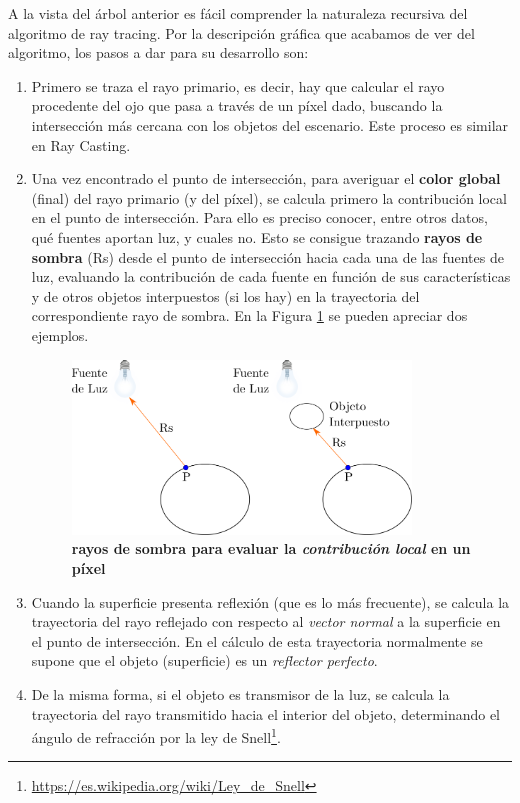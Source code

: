 A la vista del árbol anterior es fácil comprender la naturaleza recursiva del algoritmo de ray tracing. Por la descripción gráfica que acabamos de ver del algoritmo, los pasos a dar para su desarrollo son:
\begin{enumerate}
    \item Primero se traza el rayo primario, es decir, hay que calcular el rayo procedente del ojo que pasa a través de un píxel dado, buscando la intersección más cercana con los objetos del escenario. Este proceso es similar en Ray Casting.
\item Una vez encontrado el punto de intersección, para averiguar el \textbf{color global} (final) del rayo primario (y del píxel), se calcula primero la contribución local en el punto de intersección. Para ello es preciso conocer, entre otros datos, qué fuentes aportan luz, y cuales no. Esto se consigue trazando \textbf{rayos de sombra} (Rs) desde el punto de intersección hacia cada una de las fuentes de luz, evaluando la contribución de cada fuente en función de sus características y de otros objetos interpuestos (si los hay) en la trayectoria del correspondiente rayo de sombra. En la Figura \ref{fig:grafica12a} se pueden apreciar dos ejemplos.
\begin{figure}[h]
    \includegraphics[width=9cm]{Img/CPD/grafica12a.png}
    \centering
    \caption{\textbf{\footnotesize{  rayos de sombra para evaluar la \textit{contribución local} en un píxel   }}}
    \label{fig:grafica12a}
\end{figure}
\item Cuando la superficie presenta reflexión (que es lo más frecuente), se calcula la trayectoria del rayo reflejado con respecto al \textit{vector normal} a la superficie en el punto de intersección. En el cálculo de esta trayectoria normalmente se supone que el objeto (superficie) es un \textit{reflector perfecto}.

\item De la misma forma, si el objeto es transmisor de la luz, se calcula la trayectoria del rayo transmitido hacia el interior del objeto, determinando el ángulo de refracción por la ley de Snell\footnote{\url{https://es.wikipedia.org/wiki/Ley_de_Snell}}.
\end{enumerate}

